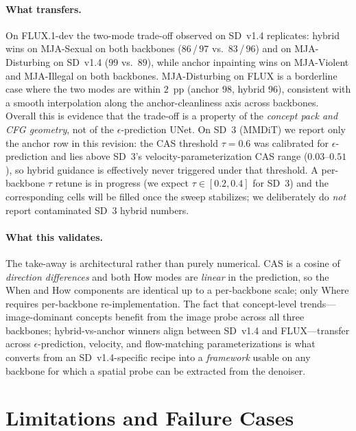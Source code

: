 

\paragraph{What transfers.}
On FLUX.1-dev the two-mode trade-off observed on SD~v1.4 replicates: hybrid wins on MJA-Sexual on both backbones ($86$\,/\,$97$ vs.\ $83$\,/\,$96$) and on MJA-Disturbing on SD~v1.4 ($99$ vs.\ $89$), while anchor inpainting wins on MJA-Violent and MJA-Illegal on both backbones. MJA-Disturbing on FLUX is a borderline case where the two modes are within $2$~pp (anchor $98$, hybrid $96$), consistent with a smooth interpolation along the anchor-cleanliness axis across backbones. Overall this is evidence that the trade-off is a property of the \emph{concept pack and CFG geometry}, not of the $\epsilon$-prediction UNet. On SD~3 (MMDiT) we report only the anchor row in this revision: the CAS threshold $\tau{=}0.6$ was calibrated for $\epsilon$-prediction and lies above SD~3's velocity-parameterization CAS range ($0.03$--$0.51$), so hybrid guidance is effectively never triggered under that threshold. A per-backbone $\tau$ retune is in progress (we expect $\tau \in [0.2, 0.4]$ for SD~3) and the corresponding cells will be filled once the sweep stabilizes; we deliberately do \emph{not} report contaminated SD~3 hybrid numbers.

\paragraph{What this validates.}
The take-away is architectural rather than purely numerical. CAS is a cosine of \emph{direction differences} and both How modes are \emph{linear} in the prediction, so the When and How components are identical up to a per-backbone scale; only Where requires per-backbone re-implementation. The fact that concept-level trends---image-dominant concepts benefit from the image probe across all three backbones; hybrid-vs-anchor winners align between SD~v1.4 and FLUX---transfer across $\epsilon$-prediction, velocity, and flow-matching parameterizations is what converts \ours{} from an SD~v1.4-specific recipe into a \emph{framework} usable on any backbone for which a spatial probe can be extracted from the denoiser.

\section{Limitations and Failure Cases}
\label{app:limitations}

